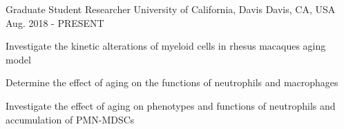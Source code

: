 

\begin{cventries}

  \cventry
    {Graduate Student Researcher} %
    {University of California, Davis} %
    {Davis, CA, USA} %
    {Aug. 2018 - PRESENT} %
    {
      \begin{cvitems} %
        \item {Investigate the kinetic alterations of myeloid cells in rhesus macaques aging model}
        \item {Determine the effect of aging on the functions of neutrophils and macrophages}
        \item {Investigate the effect of aging on phenotypes and functions of neutrophils and accumulation of PMN-MDSCs}
      \end{cvitems}
    }


\end{cventries}
